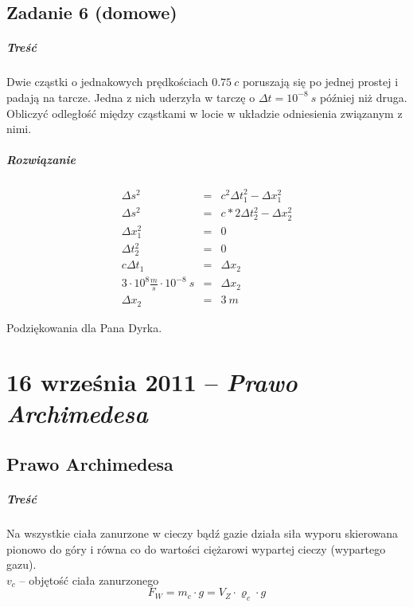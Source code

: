 \documentclass [a4paper, 11pt, oneside]{book}
\begin{document}
	\section{Zadanie 6 (domowe)} %
	\label{sec:zadanie_6_}
		\paragraph{Treść}Dwie cząstki o jednakowych prędkościach $0.75~c$ poruszają się po jednej prostej i padają na tarcze. Jedna z nich uderzyła w tarczę o $\Delta t = 10^{-8}~s$ później niż druga. Obliczyć odległość między cząstkami w locie w układzie odniesienia związanym z nimi.
		\paragraph{Rozwiązanie} 
		\begin{eqnarray*}
			\Delta s^2 & = & c^2\Delta t_1^2 - \Delta x_1^2\\
			\Delta s^2 & = & c*2\Delta t_2^2 - \Delta x_2^2\\
			\Delta x_1^2 & = & 0\\
			\Delta t_2^2 & = & 0\\
			c\Delta t_1 &=& \Delta x_2\\
			3\cdot10^8\frac{m}s \cdot 10^{-8}~s & = & \Delta x_2\\
			\Delta x_2 & = & 3~m
		\end{eqnarray*}
		\begin{flushright}
			Podziękowania dla Pana Dyrka.
		\end{flushright}

\chapter{16 września 2011 -- \textit{Prawo Archimedesa}} %
\label{cha:16_wrze_nia_2011_textit}
	\section{Prawo Archimedesa} %
	\label{sec:prawo_archimedesa}
		\paragraph{Treść} Na wszystkie ciała zanurzone w cieczy bądź gazie działa siła wyporu skierowana pionowo do góry i równa co do wartości ciężarowi wypartej cieczy (wypartego gazu).\\
		$v_c$ -- objętość ciała zanurzonego
		\[
			F_W = m_c \cdot g = V_Z \cdot \varrho _c \cdot g
		\]
\end{document}
